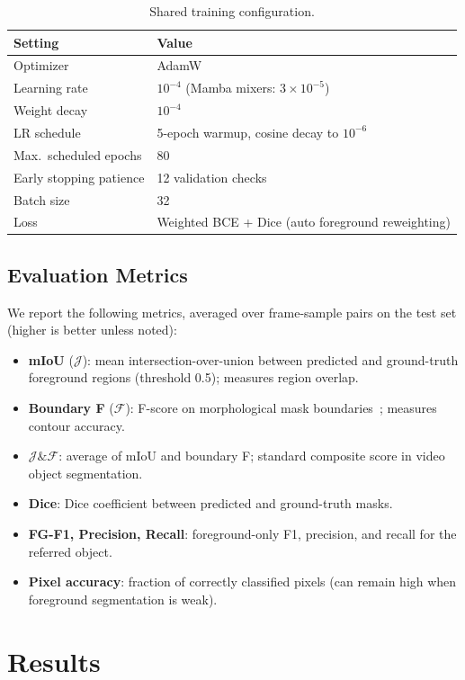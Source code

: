 \documentclass[a4paper,12pt]{extarticle}
\begin{document}
\begin{table}[t]
\centering
\caption{Shared training configuration.}
\label{tab:training}
\small
\begin{tabular}{ll}
\toprule
Setting & Value \\
\midrule
Optimizer & AdamW \\
Learning rate & $10^{-4}$ (Mamba mixers: $3{\times}10^{-5}$) \\
Weight decay & $10^{-4}$ \\
LR schedule & 5-epoch warmup, cosine decay to $10^{-6}$ \\
Max.\ scheduled epochs & 80 \\
Early stopping patience & 12 validation checks \\
Batch size & 32 \\
Loss & Weighted BCE + Dice (auto foreground reweighting) \\
\bottomrule
\end{tabular}
\end{table}

\subsection{Evaluation Metrics}

We report the following metrics, averaged over frame-sample pairs on the test set (higher is better unless noted):
\begin{itemize}
    \item \textbf{mIoU} ($\mathcal{J}$): mean intersection-over-union between predicted and ground-truth foreground regions (threshold 0.5); measures region overlap.
    \item \textbf{Boundary F} ($\mathcal{F}$): F-score on morphological mask boundaries~\cite{perazzi2016benchmark}; measures contour accuracy.
    \item \textbf{$\mathcal{J}\&\mathcal{F}$}: average of mIoU and boundary F; standard composite score in video object segmentation.
    \item \textbf{Dice}: Dice coefficient between predicted and ground-truth masks.
    \item \textbf{FG-F1, Precision, Recall}: foreground-only F1, precision, and recall for the referred object.
    \item \textbf{Pixel accuracy}: fraction of correctly classified pixels (can remain high when foreground segmentation is weak).
\end{itemize}

\section{Results}
\label{sec:results}
\end{document}
